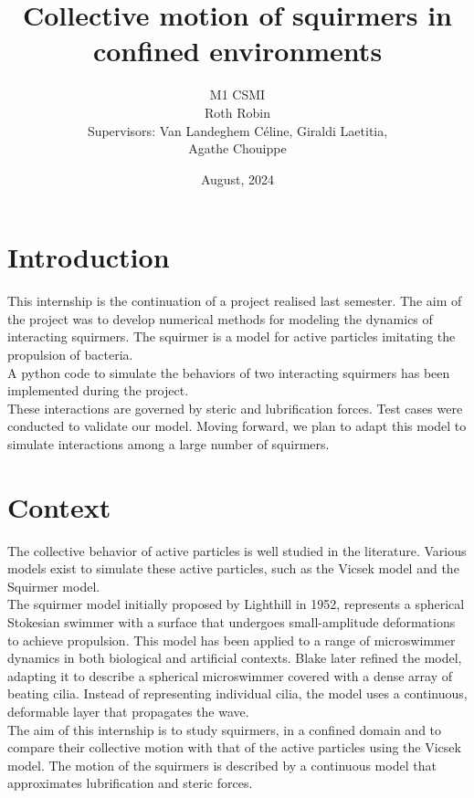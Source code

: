 \documentclass{article}
\begin{document}
\title{Collective motion of squirmers in confined environments\vspace{2cm}}
\author{
M1 CSMI\\
\vspace{3cm}
Roth Robin\\
Supervisors: Van Landeghem Céline, Giraldi Laetitia,\\ Agathe Chouippe
\vspace{2cm}}
\date{August, 2024}
\maketitle

\newpage
\tableofcontents
\newpage
\section{Introduction}
This internship is the continuation of a project realised last semester. The aim of the project was
to develop numerical methods for modeling the dynamics of interacting squirmers. The squirmer is a model for active particles imitating the propulsion of bacteria.\\
A python code to simulate the behaviors of two interacting squirmers has been implemented during the project.\\
These interactions are governed by steric and lubrification forces.
Test cases were conducted to validate our model. Moving forward, we plan to adapt this model to 
simulate interactions among a large number of squirmers.
\section{Context}
The collective behavior of active particles is well studied in the literature. 
Various models exist to simulate these active particles, such as the Vicsek model\cite{Vicsek} and the Squirmer model. \\
The squirmer model initially proposed by Lighthill in 1952\cite{Wikipedia}, represents a spherical Stokesian swimmer with a surface that undergoes 
small-amplitude deformations to achieve propulsion. 
This model has been applied to a range of microswimmer dynamics in both biological and artificial contexts. 
Blake\cite{Wikipedia} later refined the model, adapting it to describe a spherical microswimmer
 covered with a dense array of beating cilia. Instead of representing individual cilia, the model uses a continuous, deformable layer 
 that propagates the wave.\\
The aim of this internship is to study squirmers, 
in a confined domain and to compare their collective motion with that of the active particles using the Vicsek model. 
The motion of the squirmers is described by a continuous model that approximates lubrification and 
steric forces\cite{Brumley}\cite{Lauga}.
\end{document}
